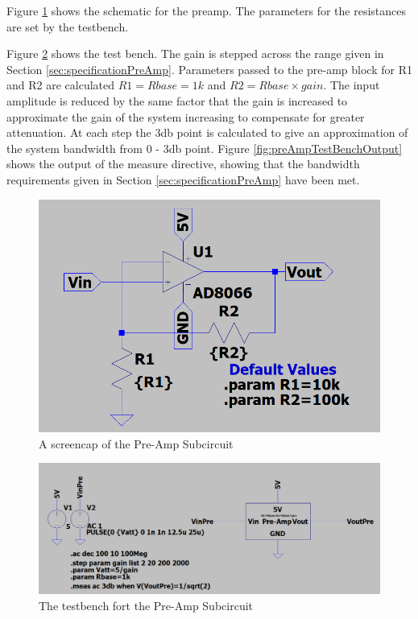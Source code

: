 Figure \ref{fig:preAmpSchematic} shows the schematic for the preamp.
The parameters for the resistances are set by the testbench.

Figure \ref{fig:preAmpTestBench} shows the test bench. 
The gain is stepped across the range given in Section \ref{sec:specificationPreAmp}.
Parameters passed to the pre-amp block for R1 and R2 are calculated \(R1 = Rbase = 1k\) and \(R2 = Rbase \times gain\).
The input amplitude is reduced by the same factor that the gain is increased to approximate the gain of the system increasing to compensate for greater attenuation.
At each step the 3db point is calculated to give an approximation of the system bandwidth from 0 - 3db point. 
Figure \ref{fig:preAmpTestBenchOutput} shows the output of the measure directive, showing that the bandwidth requirements given in Section \ref{sec:specificationPreAmp} have been met.  

\begin{figure}[H]
    \centering 
    \includegraphics[width=\textwidth]{../Circuits/Images/Pre-Amp/Schematic}
    \caption{A screencap of the Pre-Amp Subcircuit}
    \label{fig:preAmpSchematic}
\end{figure}

\begin{figure}[H]
    \centering 
    \includegraphics[width=\textwidth]{../Circuits/Images/Pre-Amp/TestBenchScreencap}
    \caption{The testbench fort the Pre-Amp Subcircuit}
    \label{fig:preAmpTestBench}
\end{figure}


